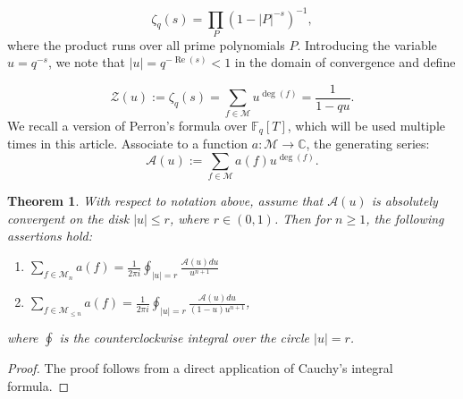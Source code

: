 \documentclass[table]{amsart}
\newtheorem{theorem}{Theorem}[section]
\newcommand{\op}[1]{\operatorname{#1}}
\numberwithin{equation}{section}
\begin{document}
\[
\zeta_q(s) = \prod_P \left( 1 - |P|^{-s} \right)^{-1},
\]
\noindent where the product runs over all prime polynomials \( P \). Introducing the variable \( u = q^{-s} \), we note that \( |u| = q^{-\operatorname{Re}(s)} < 1 \) in the domain of convergence and define 

\[
\mathcal{Z}(u) := \zeta_q(s) = \sum_{f \in \mathcal{M}} u^{\op{deg}(f)} = \frac{1}{1 - qu}.
\]
We recall a version of Perron's formula over \( \mathbb{F}_q[T] \), which will be used multiple times in this article. Associate to a function \( a: \mathcal{M} \to \mathbb{C} \), the generating series:
\[
\mathcal{A}(u) := \sum_{f \in \mathcal{M}} a(f) u^{\op{deg}(f)}.
\] 
\begin{theorem}\label{Perron's thm}
    With respect to notation above, assume that $\mathcal{A}(u)$ is absolutely convergent on the disk $|u|\leq r$, where $r\in (0, 1)$. Then for $n\geq 1$, the following assertions hold:
    \begin{enumerate}
        \item $\sum_{f \in \mathcal{M}_n} a(f)=\frac{1}{2 \pi i} \oint_{|u|=r} \frac{\mathcal{A}(u)d u}{u^{n+1}}$
        \item $\sum_{f \in \mathcal{M}_{\leq n}} a(f)=\frac{1}{2 \pi i} \oint_{|u|=r} \frac{\mathcal{A}(u)d u}{(1-u) u^{n+1}}$,
    \end{enumerate}
    where $\oint$ is the counterclockwise integral over the circle $|u|=r$.
\end{theorem}
\begin{proof}
    The proof follows from a direct application of Cauchy's integral formula.
\end{proof}
\end{document}
